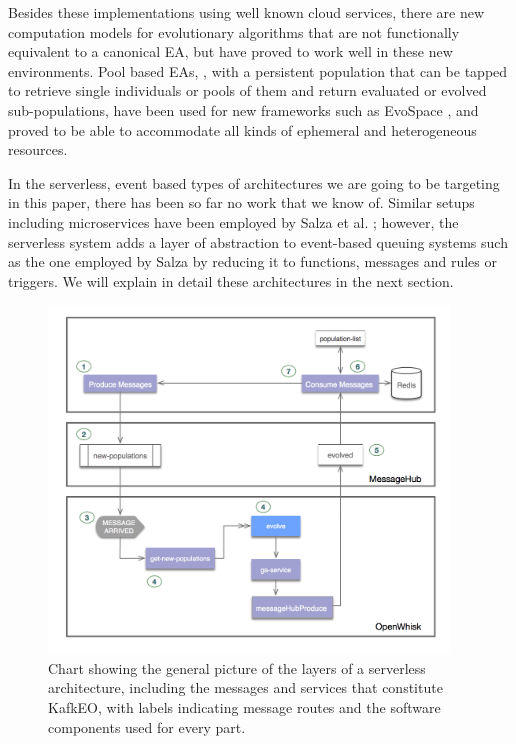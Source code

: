 \documentclass[sigconf]{acmart}
\begin{document}
Besides these implementations using well known cloud services, there are new computation models for evolutionary algorithms
that are not functionally equivalent to a canonical EA, but have
proved to work well in these new environments. Pool based EAs,
\cite{bollini1999distributed}, with a persistent population that can
be tapped to retrieve single individuals or pools of them and return
evaluated or evolved sub-populations, have been used for new
frameworks such as EvoSpace \cite{García-Valdez2015}, and proved to be
able to accommodate all kinds of ephemeral and heterogeneous
resources. 

In the serverless, event based types of architectures we are going to
be targeting in this paper, there has been so far no work that we know
of. Similar setups including microservices have been employed by Salza et
al. \cite{salza2017ccube}; however, the serverless system adds a layer
of abstraction to event-based queuing systems such as the one employed
by Salza by reducing it to functions, messages and rules or
triggers. We will explain in detail these architectures in the next
section.

\begin{figure}[t!bp]
\includegraphics[width=0.95\textwidth]{img/kafka.png}
\caption{Chart showing the general picture of the layers of a
  serverless architecture, including the messages and services that
  constitute KafkEO, with labels indicating message
  routes and the software components used for every part.}
\label{fig:kafkeo}
\end{figure}
%
\end{document}
